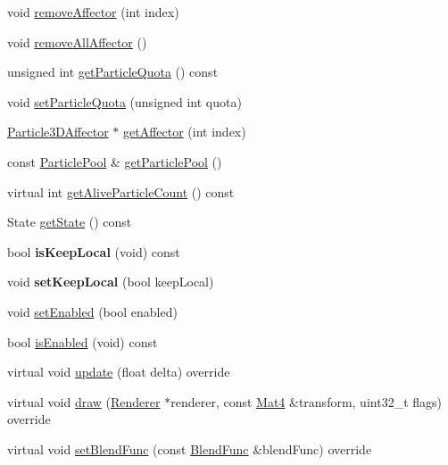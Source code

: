 \begin{DoxyCompactItemize}
void \hyperlink{classParticleSystem3D_a159d6fc0ffeb25901b1836e86b5e3dc4}{remove\+Affector} (int index)
\item 
void \hyperlink{classParticleSystem3D_ab70f79480eab32ba5e32f36690809a9c}{remove\+All\+Affector} ()
\item 
unsigned int \hyperlink{classParticleSystem3D_a1304d9f882b2fb6e2db12d8067755c38}{get\+Particle\+Quota} () const
\item 
void \hyperlink{classParticleSystem3D_a6ab232323237daf0287d6d2e22089216}{set\+Particle\+Quota} (unsigned int quota)
\item 
\hyperlink{classParticle3DAffector}{Particle3\+D\+Affector} $\ast$ \hyperlink{classParticleSystem3D_a68fde91bc0333e387cc31d84ba69092c}{get\+Affector} (int index)
\item 
const \hyperlink{classDataPool}{Particle\+Pool} \& \hyperlink{classParticleSystem3D_a195df72ace8428bc873d0838ebc02a2a}{get\+Particle\+Pool} ()
\item 
virtual int \hyperlink{classParticleSystem3D_aa7437bbc0845857deea675f0fb137314}{get\+Alive\+Particle\+Count} () const
\item 
State \hyperlink{classParticleSystem3D_a01944e27032c4afa6f115b69a0d359ed}{get\+State} () const
\item 
\mbox{\label{classParticleSystem3D_a87a2ac7688963232fd563e610dd558e9}} 
bool {\bfseries is\+Keep\+Local} (void) const
\item 
\mbox{\label{classParticleSystem3D_a7f346946b10068d5650efbada90d0083}} 
void {\bfseries set\+Keep\+Local} (bool keep\+Local)
\item 
void \hyperlink{classParticleSystem3D_a7e2e3536676b85183c6bb3e04e9f33ec}{set\+Enabled} (bool enabled)
\item 
bool \hyperlink{classParticleSystem3D_a1c9b24591395d002ca3fc953d2ce938e}{is\+Enabled} (void) const
\item 
virtual void \hyperlink{classParticleSystem3D_a446b0819b60fb46ce308e3d17e7625b0}{update} (float delta) override
\item 
virtual void \hyperlink{classParticleSystem3D_af039c3af0d3805791c65c58d9abccc8a}{draw} (\hyperlink{classRenderer}{Renderer} $\ast$renderer, const \hyperlink{classMat4}{Mat4} \&transform, uint32\+\_\+t flags) override
\item 
virtual void \hyperlink{classParticleSystem3D_a4a1a9b7ade8b4ed237a1bb7da3ff462e}{set\+Blend\+Func} (const \hyperlink{structBlendFunc}{Blend\+Func} \&blend\+Func) override

\end{DoxyCompactItemize}
